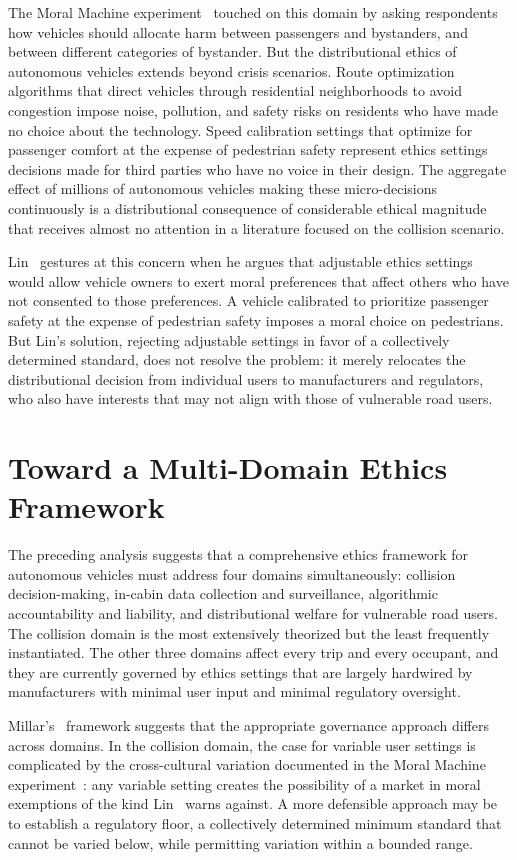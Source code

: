 \documentclass{ieee-portfolio}
\begin{document}
The Moral Machine experiment~\cite{awad_moral_2018} touched on this domain by asking respondents how vehicles should allocate harm between passengers and bystanders, and between different categories of bystander. But the distributional ethics of autonomous vehicles extends beyond crisis scenarios. Route optimization algorithms that direct vehicles through residential neighborhoods to avoid congestion impose noise, pollution, and safety risks on residents who have made no choice about the technology. Speed calibration settings that optimize for passenger comfort at the expense of pedestrian safety represent ethics settings decisions made for third parties who have no voice in their design. The aggregate effect of millions of autonomous vehicles making these micro-decisions continuously is a distributional consequence of considerable ethical magnitude that receives almost no attention in a literature focused on the collision scenario.
 
Lin~\cite{lin_heres_2014} gestures at this concern when he argues that adjustable ethics settings would allow vehicle owners to exert moral preferences that affect others who have not consented to those preferences. A vehicle calibrated to prioritize passenger safety at the expense of pedestrian safety imposes a moral choice on pedestrians. But Lin's solution, rejecting adjustable settings in favor of a collectively determined standard, does not resolve the problem: it merely relocates the distributional decision from individual users to manufacturers and regulators, who also have interests that may not align with those of vulnerable road users.
 
\section{Toward a Multi-Domain Ethics Framework}
 
The preceding analysis suggests that a comprehensive ethics framework for autonomous vehicles must address four domains simultaneously: collision decision-making, in-cabin data collection and surveillance, algorithmic accountability and liability, and distributional welfare for vulnerable road users. The collision domain is the most extensively theorized but the least frequently instantiated. The other three domains affect every trip and every occupant, and they are currently governed by ethics settings that are largely hardwired by manufacturers with minimal user input and minimal regulatory oversight.
 
Millar's~\cite{millar_ethics_2017} framework suggests that the appropriate governance approach differs across domains. In the collision domain, the case for variable user settings is complicated by the cross-cultural variation documented in the Moral Machine experiment~\cite{awad_moral_2018}: any variable setting creates the possibility of a market in moral exemptions of the kind Lin~\cite{lin_heres_2014} warns against. A more defensible approach may be to establish a regulatory floor, a collectively determined minimum standard that cannot be varied below, while permitting variation within a bounded range.
 
\end{document}
